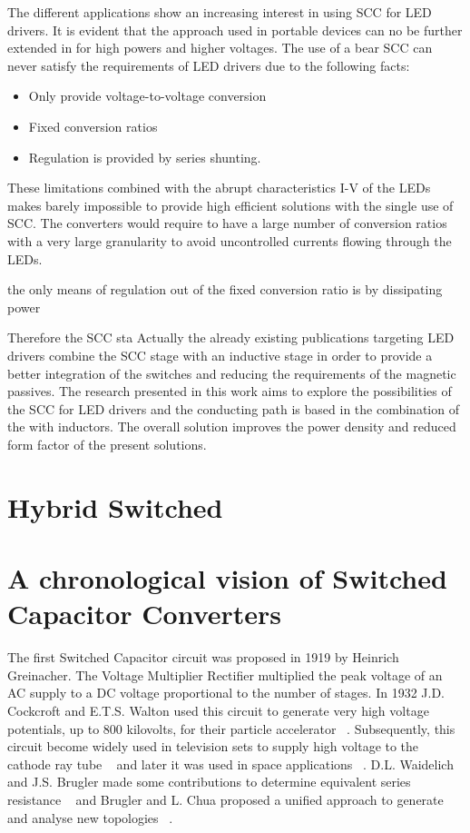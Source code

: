 The different applications show an increasing interest in using SCC for LED drivers. It is evident that the approach used in portable devices can no be further extended in for high powers and higher voltages. The use of a bear SCC can never satisfy the requirements of LED drivers due to the following facts:
\begin{itemize}
  \item Only provide voltage-to-voltage conversion
  \item Fixed conversion ratios
  \item Regulation is provided by series shunting.
\end{itemize}
These limitations combined with the abrupt characteristics I-V of the LEDs makes barely impossible to provide high efficient solutions with the single use of SCC. The converters would require to have a large number of conversion ratios with a very large granularity to avoid uncontrolled currents flowing through the LEDs.



the only means of regulation out of the fixed conversion ratio is by dissipating power


Therefore the SCC sta Actually the already existing publications targeting LED drivers combine the SCC stage with an inductive stage in order to provide a better integration of the switches and reducing the requirements of the magnetic passives. The research presented in this work aims to explore the possibilities of the SCC for LED drivers and the conducting path is based in the combination of the with inductors. The overall solution improves the power density and reduced form factor of the present solutions.


\section{Hybrid Switched}



\section[Chronological Vision of SCC]{A chronological vision of Switched Capacitor Converters}


The first Switched Capacitor circuit was proposed in 1919 by Heinrich Greinacher. The Voltage Multiplier Rectifier
multiplied the peak voltage of an AC supply to a DC voltage proportional to the number of stages.
In 1932 J.D. Cockcroft and E.T.S. Walton used this circuit to generate very high voltage potentials,
up to 800 kilovolts, for their particle accelerator ~\cite{30Cock}. Subsequently, this circuit become widely used in
television sets to supply high voltage to the cathode ray tube ~\cite{70Buechel} and later it was used in space applications
~\cite{86Weinberg}. D.L. Waidelich and J.S. Brugler made some contributions to determine equivalent series resistance
~\cite{44Waidelich,71Brugler} and Brugler and L. Chua proposed a unified approach to generate and analyse new topologies
~\cite{71Brugler,77Lin}.



